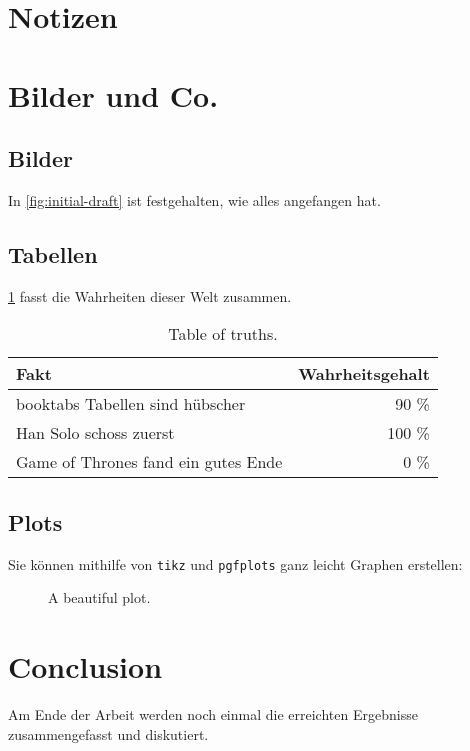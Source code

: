 \section{Notizen}%


\section{Bilder und Co.}

\subsection{Bilder}%
\label{sec:figures}

In \cref{fig:initial-draft} ist festgehalten,
wie alles angefangen hat.


\subsection{Tabellen}%
\label{sec:tables}

\cref{table:truths} fasst die Wahrheiten dieser Welt zusammen.

\begin{table}[ht]
  \begin{center}
    \begin{tabular}{lr}
      \toprule
      Fakt                                & Wahrheitsgehalt \\
      \midrule
      booktabs Tabellen sind hübscher     & 90 \%           \\
      Han Solo schoss zuerst              & 100 \%          \\
      Game of Thrones fand ein gutes Ende & 0 \%            \\
      \bottomrule
    \end{tabular}
    \caption{Table of truths.}%
    \label{table:truths}
  \end{center}
\end{table}

\subsection{Plots}%
\label{sec:plot}

Sie können mithilfe von \texttt{tikz} und \texttt{pgfplots}
ganz leicht Graphen erstellen:

\begin{figure}[ht]
  \centering
  \caption{A beautiful plot.}%
  \label{fig:the-plot}
\end{figure}

\section{Conclusion}

Am Ende der Arbeit werden noch einmal die erreichten Ergebnisse
zusammengefasst und diskutiert.
